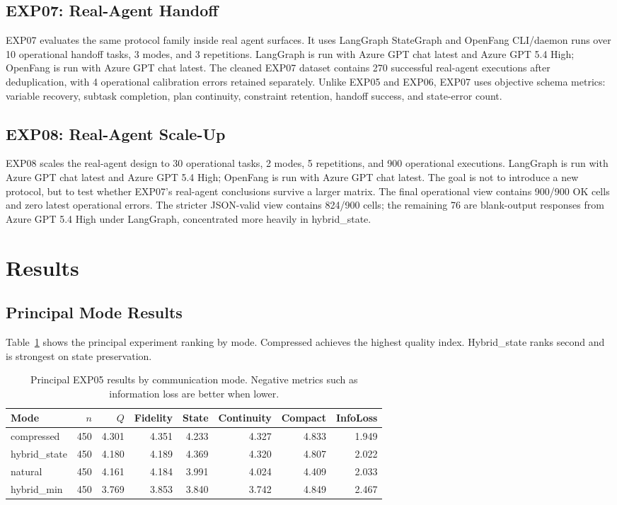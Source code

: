 \documentclass[11pt]{article}
\begin{document}
\subsection{EXP07: Real-Agent Handoff}
EXP07 evaluates the same protocol family inside real agent surfaces. It uses LangGraph StateGraph and OpenFang CLI/daemon runs over 10 operational handoff tasks, 3 modes, and 3 repetitions. LangGraph is run with Azure GPT chat latest and Azure GPT 5.4 High; OpenFang is run with Azure GPT chat latest. The cleaned EXP07 dataset contains 270 successful real-agent executions after deduplication, with 4 operational calibration errors retained separately. Unlike EXP05 and EXP06, EXP07 uses objective schema metrics: variable recovery, subtask completion, plan continuity, constraint retention, handoff success, and state-error count.

\subsection{EXP08: Real-Agent Scale-Up}
EXP08 scales the real-agent design to 30 operational tasks, 2 modes, 5 repetitions, and 900 operational executions. LangGraph is run with Azure GPT chat latest and Azure GPT 5.4 High; OpenFang is run with Azure GPT chat latest. The goal is not to introduce a new protocol, but to test whether EXP07's real-agent conclusions survive a larger matrix. The final operational view contains 900/900 OK cells and zero latest operational errors. The stricter JSON-valid view contains 824/900 cells; the remaining 76 are blank-output responses from Azure GPT 5.4 High under LangGraph, concentrated more heavily in hybrid\_state.

\section{Results}
\subsection{Principal Mode Results}
Table~\ref{tab:principal_modes} shows the principal experiment ranking by mode. Compressed achieves the highest quality index. Hybrid\_state ranks second and is strongest on state preservation.

\begin{table}[ht]
\centering
\small
\begin{tabular}{lrrrrrrr}
\toprule
Mode & $n$ & $Q$ & Fidelity & State & Continuity & Compact & InfoLoss \\
\midrule
compressed & 450 & 4.301 & 4.351 & 4.233 & 4.327 & 4.833 & 1.949 \\
hybrid\_state & 450 & 4.180 & 4.189 & 4.369 & 4.320 & 4.807 & 2.022 \\
natural & 450 & 4.161 & 4.184 & 3.991 & 4.024 & 4.409 & 2.033 \\
hybrid\_min & 450 & 3.769 & 3.853 & 3.840 & 3.742 & 4.849 & 2.467 \\
\bottomrule
\end{tabular}
\caption{Principal EXP05 results by communication mode. Negative metrics such as information loss are better when lower.}
\label{tab:principal_modes}
\end{table}
\end{document}
